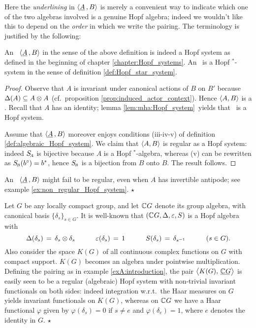 Here the {\em underlining\/} in $\langle \underline{A}\,,B \rangle$ is merely a convenient
way to indicate which one of the two algebras involved is a genuine Hopf algebra;
indeed we wouldn't like this to depend on the {\em order\/} in which we write the pairing.
The terminology is justified by the following:

\begin{prop}
An \ahs\ $\langle \underline{A}\,,B \rangle$ in the sense of the above definition is indeed
a Hopf system as defined in the beginning of chapter \ref{chapter:Hopf_systems}\@.
An \ahss\ is a Hopf $^*$-system in the sense of definition \ref{def:Hopf_star_system}.
\end{prop}

\begin{proof}
Observe that $A$ is invariant under canonical actions of $B$ on $B'$ because
$\Delta(A) \subseteq A\otimes A$ (cf.\ proposition \ref{prop:induced_actor_context}).
Hence $\langle A,B \rangle$ is a \dpa\@. Recall that $A$ has an identity;
lemma \ref{lem:mha:Hopf_system}\ yields that \pairAB\ is a Hopf system.

Assume that $\langle \underline{A}\,,B \rangle$ moreover enjoys conditions (iii-iv-v)
of definition \ref{def:algebraic_Hopf_system}\@.
We claim that $\langle A,B \rangle$ is regular as a Hopf system:
indeed $S_{\scriptscriptstyle \! A}$ is bijective because $A$ is a Hopf $^*$-algebra,
whereas (v) can be rewritten as $S_{\scriptscriptstyle \! B}(b^\circ) = b^*$,
hence $S_{\scriptscriptstyle \! B}$ is a bijection from $B$ onto $B$. The result follows.
\end{proof}



\begin{remark}  \rm
An \ahs\ $\langle \underline{A}\,,B \rangle$ might fail to be regular,
even when $A$ has invertible antipode; see example \ref{ex:non_regular_Hopf_system}\@.
\hfill $\star$
\end{remark}



\begin{ex} \rm
Let $G$ be any locally compact group, and let $\mathbb{C} \hspace{.5pt} G$ denote its group algebra,
with canonical basis $\{\delta_s\}_{s\in G}$.
It is well-known that $(\mathbb{C} \hspace{.5pt} G,\Delta,\varepsilon,S)$ is a Hopf algebra with
$$ \Delta(\delta_s) \,=\, \delta_s \otimes \delta_s   \hspace{3em}
   \varepsilon(\delta_s)   \,=\, 1                         \hspace{3em}
   S(\delta_s)      \,=\, \delta_{s^{-1}}           \hspace{3em}
   (s \in G).   $$
Also consider the space $K(G)$ of all continuous complex functions on $G$
with compact support. $K(G)$ becomes an algebra under pointwise multiplication.
Defining the pairing as in example \ref{exA:introduction}, the pair
$\pairM{K(G)}{\underline{\CC \vssp G\!}\,}$ is easily seen to be a regular
(algebraic) Hopf system with non-trivial invariant functionals on both sides:
indeed integration w.r.t.\ the Haar measures on $G$ yields invariant
functionals on $K(G)$, whereas on $\mathbb{C} \hspace{.5pt} G$ we have a Haar functional $\varphi$
given by $\varphi(\delta_s) = 0$ if $s\neq e$ and $\varphi(\delta_e) = 1$,
where $e$ denotes the identity in $G$.
\hfill $\star$
\end{ex}


